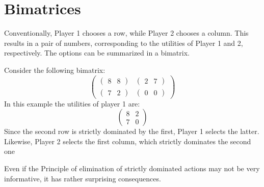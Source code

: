 \section{Bimatrices}

Conventionally, Player 1 chooses a row, while Player 2 chooses a column.
This results in a pair of numbers, corresponding to the utilities of Player 1 and 2, respectively. The options can be summarized in a bimatrix.
\begin{example}
   Consider the following bimatrix:
    \[\begin{pmatrix}
        \begin{pmatrix} 8 & 8 \end{pmatrix} & \begin{pmatrix} 2 & 7 \end{pmatrix} \\
        \begin{pmatrix} 7 & 2 \end{pmatrix} & \begin{pmatrix} 0 & 0 \end{pmatrix}
    \end{pmatrix}\]
    In this example the utilities of player 1 are: 
    \[\begin{pmatrix}
        8 & 2 \\
        7 & 0
    \end{pmatrix}\]
    Since the second row is strictly dominated by the first, Player 1 selects the latter. Likewise, Player 2 selects the first column, which strictly dominates the second one
\end{example}
Even if the Principle of elimination of strictly dominated actions may not be very informative, it has rather surprising consequences.
